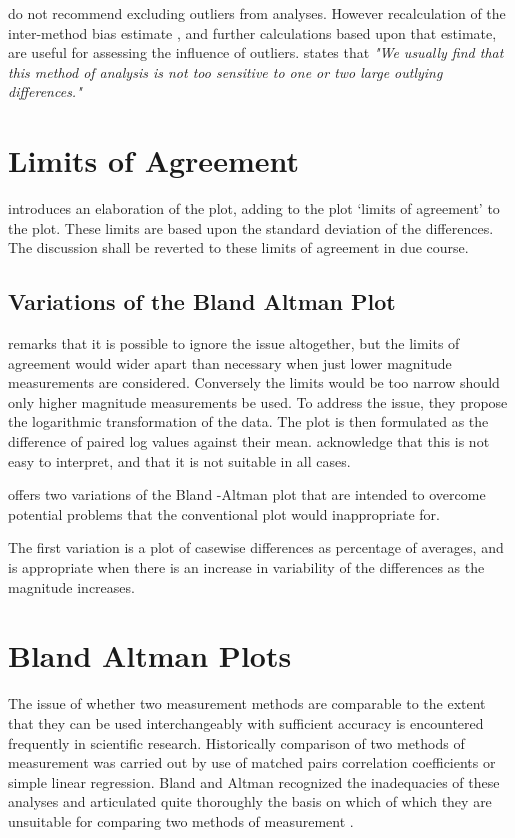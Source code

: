 \documentclass[Chap2main.tex]{subfiles}
\begin{document}
	\citet*{BA99} do not recommend excluding outliers from analyses. However recalculation of the inter-method bias estimate , and
	further calculations based upon that estimate, are useful for assessing the influence of outliers.\citep{BA99} states that
	\emph{"We usually find that this method of analysis is not too sensitive to one or two large outlying differences."}
	
	\newpage
	\section{Limits of Agreement}
	\citet{BA86} introduces an elaboration of the plot, adding to the plot `limits of agreement' to the plot. These limits are based
	upon the standard deviation of the differences. The discussion shall be reverted to these limits of agreement in due course.
	
	\subsection{Variations of the Bland Altman Plot}
	\citet{BA99} remarks that it is possible to ignore the issue altogether, but the limits of agreement would wider apart than
	necessary when just lower magnitude measurements are considered. Conversely the limits would be too narrow should only higher
	magnitude measurements be used. To address the issue, they propose the logarithmic transformation of the data. The plot is then
	formulated as the difference of paired log values against their mean. \citet{BA99} acknowledge that this is not easy to interpret,
	and that it is not suitable in all cases.
	
	\citet{BA99} offers two variations of the Bland -Altman plot that are intended to overcome potential problems that the conventional
	plot would inappropriate for.
	
	The first variation is a plot of casewise differences as percentage of averages, and is appropriate when there is an
	increase in variability of the differences as the magnitude increases.
	
	
	
	\section{Bland Altman Plots}
	The issue of whether two measurement methods are comparable to the extent that they can be used interchangeably with sufficient
	accuracy is encountered frequently in scientific research. Historically comparison of two methods of measurement was carried
	out by use of matched pairs correlation coefficients or simple linear regression. Bland and Altman recognized the inadequacies of
	these analyses and articulated quite thoroughly the basis on which of which they are unsuitable for comparing two methods of
	measurement \citep*{BA83}.
	
\end{document}
